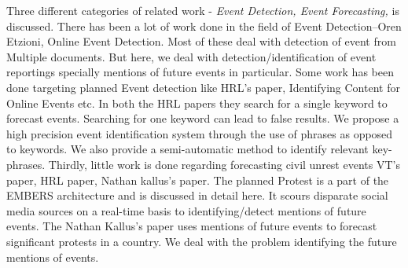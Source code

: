 Three different categories of related work - \emph{Event Detection, Event Forecasting, } is discussed. There has been a lot of work done in the field of Event Detection--Oren Etzioni, Online Event Detection. Most of these deal with detection of event from Multiple documents. But here, we deal with detection/identification of event reportings specially mentions of future events in particular. Some work has been done targeting planned Event detection like HRL's paper, Identifying Content for Online Events etc. In both the HRL papers they search for a single keyword to forecast events. Searching for one keyword can lead to false results. We propose a high precision event identification system through the use of phrases as opposed to keywords. We also provide a semi-automatic method to identify relevant key-phrases. 
Thirdly, little work is done regarding forecasting civil unrest events {VT's paper, HRL paper, Nathan kallus's paper}. The planned Protest is a part of the EMBERS architecture and is discussed in detail here. It scours disparate social media sources on a real-time basis to identifying/detect mentions of future events. The Nathan Kallus's paper uses mentions of future events to forecast significant protests in a country. We deal with the problem identifying the future mentions of events.


